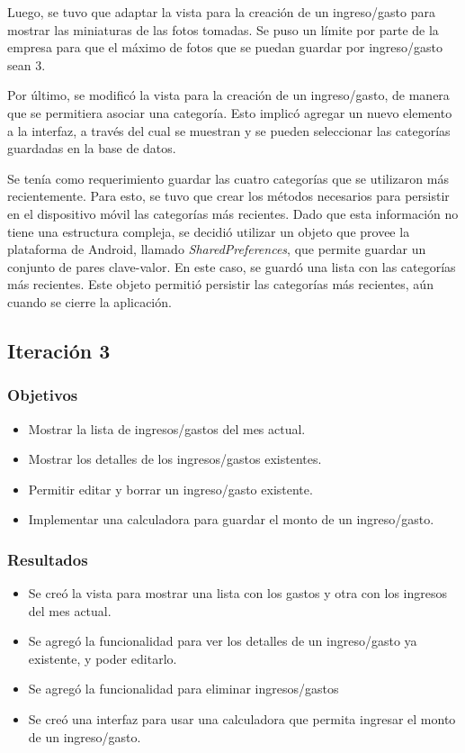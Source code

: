 Luego, se tuvo que adaptar la vista para la creación de un ingreso/gasto para mostrar las miniaturas de las fotos tomadas. Se puso un límite por parte de la empresa para que el máximo de fotos que se puedan guardar por ingreso/gasto sean 3.

Por último, se modificó la vista para la creación de un ingreso/gasto, de manera que se permitiera asociar una categoría. Esto implicó agregar un nuevo elemento a la interfaz, a través del cual se muestran y se pueden seleccionar las categorías guardadas en la base de datos. 

Se tenía como requerimiento guardar las cuatro categorías que se utilizaron más recientemente. Para esto, se tuvo que crear los métodos necesarios para persistir en el dispositivo móvil las categorías más recientes. Dado que esta información no tiene una estructura compleja, se decidió utilizar un objeto que provee la plataforma de Android, llamado \textit{SharedPreferences}, que permite guardar un conjunto de pares clave-valor. En este caso, se guardó una lista con las categorías más recientes. Este objeto permitió persistir las categorías más recientes, aún cuando se cierre la aplicación.

\subsection{Iteración 3}
\subsubsection{Objetivos}
\begin{itemize}
\item Mostrar la lista de ingresos/gastos del mes actual.
\item Mostrar los detalles de los ingresos/gastos existentes.
\item Permitir editar y borrar un ingreso/gasto existente.
\item Implementar una calculadora para guardar el monto de un ingreso/gasto.
\end{itemize}

\subsubsection{Resultados}
\begin{itemize}
\item Se creó la vista para mostrar una lista con los gastos y otra con los ingresos del mes actual.
\item Se agregó la funcionalidad para ver los detalles de un ingreso/gasto ya existente, y poder editarlo.
\item Se agregó la funcionalidad para eliminar ingresos/gastos
\item Se creó una interfaz para usar una calculadora que permita ingresar el monto de un ingreso/gasto.
\end{itemize}

